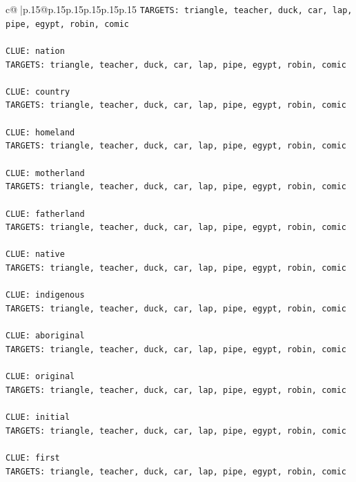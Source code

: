 \documentclass{article}
\begin{document}
{\begin{supertabular}{c@{$\;$}|p{.15\linewidth}@{}p{.15\linewidth}p{.15\linewidth}p{.15\linewidth}p{.15\linewidth}p{.15\linewidth}}
{{{\texttt{TARGETS: triangle, teacher, duck, car, lap, pipe, egypt, robin, comic} \\
\\ 
\texttt{CLUE: nation} \\
\texttt{TARGETS: triangle, teacher, duck, car, lap, pipe, egypt, robin, comic} \\
\\ 
\texttt{CLUE: country} \\
\texttt{TARGETS: triangle, teacher, duck, car, lap, pipe, egypt, robin, comic} \\
\\ 
\texttt{CLUE: homeland} \\
\texttt{TARGETS: triangle, teacher, duck, car, lap, pipe, egypt, robin, comic} \\
\\ 
\texttt{CLUE: motherland} \\
\texttt{TARGETS: triangle, teacher, duck, car, lap, pipe, egypt, robin, comic} \\
\\ 
\texttt{CLUE: fatherland} \\
\texttt{TARGETS: triangle, teacher, duck, car, lap, pipe, egypt, robin, comic} \\
\\ 
\texttt{CLUE: native} \\
\texttt{TARGETS: triangle, teacher, duck, car, lap, pipe, egypt, robin, comic} \\
\\ 
\texttt{CLUE: indigenous} \\
\texttt{TARGETS: triangle, teacher, duck, car, lap, pipe, egypt, robin, comic} \\
\\ 
\texttt{CLUE: aboriginal} \\
\texttt{TARGETS: triangle, teacher, duck, car, lap, pipe, egypt, robin, comic} \\
\\ 
\texttt{CLUE: original} \\
\texttt{TARGETS: triangle, teacher, duck, car, lap, pipe, egypt, robin, comic} \\
\\ 
\texttt{CLUE: initial} \\
\texttt{TARGETS: triangle, teacher, duck, car, lap, pipe, egypt, robin, comic} \\
\\ 
\texttt{CLUE: first} \\
\texttt{TARGETS: triangle, teacher, duck, car, lap, pipe, egypt, robin, comic} \\
}}}
\end{supertabular}}
\end{document}
